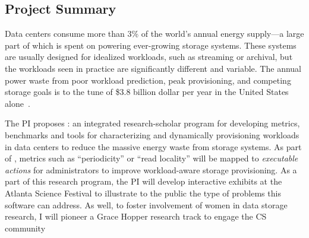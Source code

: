 
\subsection*{Project Summary}


Data centers consume more than 3\% of the world's annual energy supply---a large part
of which is spent on powering ever-growing storage systems.
These systems are usually designed for idealized workloads, such as streaming or archival, but
the workloads seen in practice are significantly different and variable. 
The annual power waste from poor workload prediction, peak provisioning, and competing storage goals is to the tune of \$3.8 billion dollar per year in the United States alone~\cite{masanet,nrdc}.

The PI proposes \at{}: an integrated research-scholar program 
for developing metrics, benchmarks and tools for characterizing and dynamically provisioning workloads in data centers to reduce the massive energy waste from storage systems. 
As part of \at{}, metrics such as ``periodicity'' or ``read locality'' will be
mapped to \textit{executable actions} for administrators to improve workload-aware
storage provisioning. As a part of this research program, the PI will develop interactive exhibits at the Atlanta Science Festival to illustrate to the public the type of problems this software can address. As well, to foster involvement of women in data storage research, I will pioneer a Grace Hopper research track to engage the CS community

